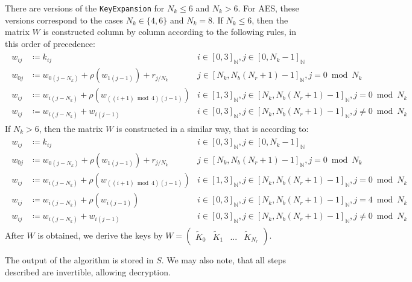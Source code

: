 \begin{enumerate}[label=(\roman*)]
    There are versions of the \texttt{KeyExpansion} for \(N_k \leq 6\) and \(N_k > 6\). For AES, these versions correspond to the cases \(N_k \in \{4, 6\}\) and \(N_k = 8\). If \(N_k \leq 6\), then the matrix \(W\) is constructed column by column according to the following rules, in this order of precedence:
    \begin{align}
        \begin{array}{rll}
            w_{ij} &\coloneqq k_{ij} & i \in [0, 3]_{\mathbb{N}}, j \in [0, N_k-1]_{\mathbb{N}}\\
            w_{0j} &\coloneqq w_{0(j-N_k)} + \rho(w_{1(j-1)}) + r_{j/N_k} & j \in [N_k, N_b(N_r+1)-1]_{\mathbb{N}}, j = 0 \bmod N_k\\
            w_{ij} &\coloneqq w_{i(j-N_k)} + \rho(w_{((i+1) \bmod 4)(j-1)}) & i \in [1, 3]_{\mathbb{N}}, j \in [N_k, N_b(N_r+1)-1]_{\mathbb{N}}, j = 0 \bmod N_k\\
            w_{ij} &\coloneqq w_{i(j-N_k)} + w_{i(j-1)} & i \in [0, 3]_{\mathbb{N}}, j \in [N_k, N_b(N_r+1)-1]_{\mathbb{N}}, j \neq 0 \bmod N_k
        \end{array}
    \end{align}
    If \(N_k > 6\), then the matrix \(W\) is constructed in a similar way, that is according to:
    \begin{align}
        \begin{array}{rll}
            w_{ij} &\coloneqq k_{ij} & i \in [0, 3]_{\mathbb{N}}, j \in [0, N_k-1]_{\mathbb{N}}\\
            w_{0j} &\coloneqq w_{0(j-N_k)} + \rho(w_{1(j-1)}) + r_{j/N_k} & j \in [N_k, N_b(N_r+1)-1]_{\mathbb{N}}, j = 0 \bmod N_k\\
            w_{ij} &\coloneqq w_{i(j-N_k)} + \rho(w_{((i+1) \bmod 4)(j-1)}) & i \in [1, 3]_{\mathbb{N}}, j \in [N_k, N_b(N_r+1)-1]_{\mathbb{N}}, j = 0 \bmod N_k\\
            w_{ij} &\coloneqq w_{i(j-N_k)} + \rho(w_{i(j-1)}) & i \in [0, 3]_{\mathbb{N}}, j \in [N_k, N_b(N_r+1)-1]_{\mathbb{N}}, j = 4 \bmod N_k\\
            w_{ij} &\coloneqq w_{i(j-N_k)} + w_{i(j-1)} & i \in [0, 3]_{\mathbb{N}}, j \in [N_k, N_b(N_r+1)-1]_{\mathbb{N}}, j \neq 0 \bmod N_k
        \end{array}
    \end{align}
    After \(W\) is obtained, we derive the keys by \(W = \begin{pmatrix}
        \tilde{K}_0 & \tilde{K}_1 & ... & \tilde{K}_{N_r}
    \end{pmatrix}\).
\end{enumerate}
The output of the algorithm is stored in \(S\). We may also note, that all steps described are invertible, allowing decryption.

